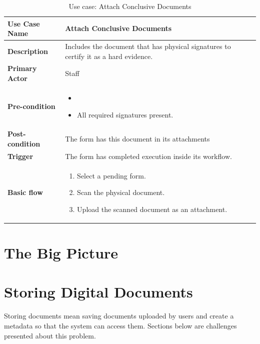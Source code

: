 \begin{table}
	\centering
	\caption{Use case: Attach Conclusive Documents}
	\label{tbl-usecase:attach-conclusive-documents}
	\begin{tabular}{|l|L{9cm}|}
		\hline
		\textbf{Use Case Name} & Attach Conclusive Documents \\
		\hline
		
		\textbf{Description} & Includes the document that has physical signatures to certify it as a hard evidence. \\
		\textbf{Primary Actor} & Staff \\
		\textbf{Pre-condition} & 
		\begin{itemize}
			\item \alreadylogin
			\item All required signatures present.
		\end{itemize} \\
		
		\textbf{Post-condition} & The form has this document in its attachments \\
		\textbf{Trigger} & The form has completed execution inside its workflow. \\
		\textbf{Basic flow} & 
		\begin{enumerate}
			\item Select a pending form.
			\item Scan the physical document.
			\item Upload the scanned document as an attachment.
		\end{enumerate} \\
		\hline
	\end{tabular}
\end{table}

\section{The Big Picture}


\section{Storing Digital Documents}
Storing documents mean saving documents uploaded by users and create a metadata so that the system can access them.
Sections below are challenges presented about this problem.

